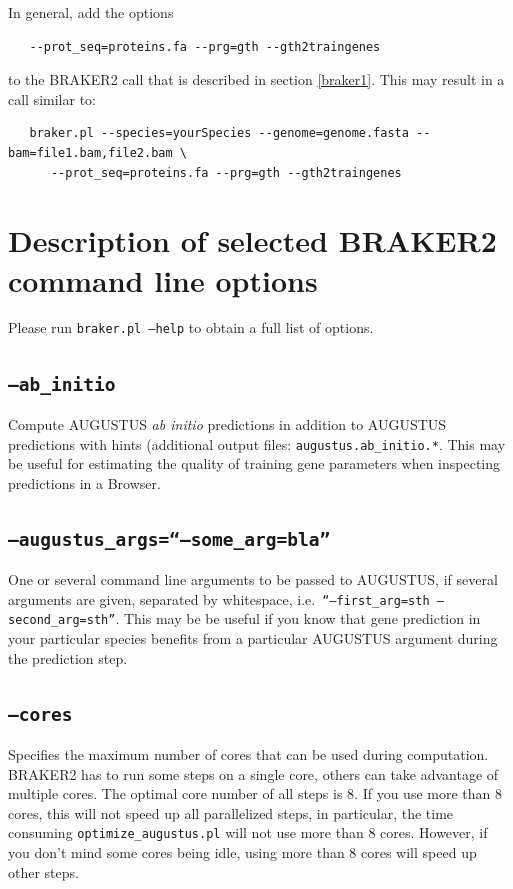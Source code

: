 \documentclass[a4paper,10pt]{report}
\begin{document}
In general, add the options

\begin{verbatim}
   --prot_seq=proteins.fa --prg=gth --gth2traingenes
\end{verbatim}

to the BRAKER2 call that is described in section \ref{braker1}. This may result in a call similar to:

\begin{verbatim}
   braker.pl --species=yourSpecies --genome=genome.fasta --bam=file1.bam,file2.bam \
      --prot_seq=proteins.fa --prg=gth --gth2traingenes
\end{verbatim}

\section{Description of selected BRAKER2 command line options}\label{options}

Please run \texttt{braker.pl --help} to obtain a full list of options.

\subsection{\texttt{--ab\_initio}}

Compute AUGUSTUS \textit{ab initio} predictions in addition to AUGUSTUS predictions with hints (additional output files: \texttt{augustus.ab\_initio.*}. This may be useful for estimating the quality of training gene parameters when inspecting predictions in a Browser.

\subsection{\texttt{--augustus\_args=``--some\_arg=bla''}}     
One or several command line arguments to be passed to AUGUSTUS, if several arguments are given, separated by whitespace, i.e.~\texttt{``--first\_arg=sth --second\_arg=sth''}. This may be be useful if you know that gene prediction in your particular species benefits from a particular AUGUSTUS argument during the prediction step.  
    
\subsection{\texttt{--cores}}                              Specifies the maximum number of cores that can be used during computation. BRAKER2 has to run some steps on a single core, others can take advantage of multiple cores. The optimal core number of all steps is 8. If you use more than 8 cores, this will not speed up all parallelized steps, in particular, the time consuming \texttt{optimize\_augustus.pl} will not use more than 8 cores. However, if you don't mind some cores being idle, using more than 8 cores will speed up other steps.
\end{document}
